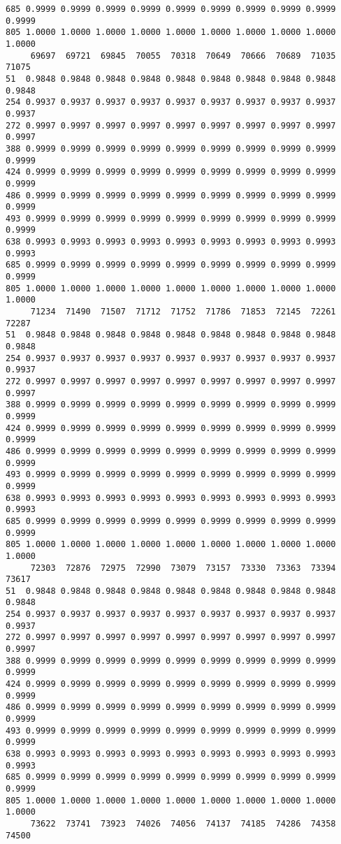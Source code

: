 \documentclass[
]{report}
\begin{document}
\begin{verbatim}
685 0.9999 0.9999 0.9999 0.9999 0.9999 0.9999 0.9999 0.9999 0.9999 0.9999
805 1.0000 1.0000 1.0000 1.0000 1.0000 1.0000 1.0000 1.0000 1.0000 1.0000
     69697  69721  69845  70055  70318  70649  70666  70689  71035  71075
51  0.9848 0.9848 0.9848 0.9848 0.9848 0.9848 0.9848 0.9848 0.9848 0.9848
254 0.9937 0.9937 0.9937 0.9937 0.9937 0.9937 0.9937 0.9937 0.9937 0.9937
272 0.9997 0.9997 0.9997 0.9997 0.9997 0.9997 0.9997 0.9997 0.9997 0.9997
388 0.9999 0.9999 0.9999 0.9999 0.9999 0.9999 0.9999 0.9999 0.9999 0.9999
424 0.9999 0.9999 0.9999 0.9999 0.9999 0.9999 0.9999 0.9999 0.9999 0.9999
486 0.9999 0.9999 0.9999 0.9999 0.9999 0.9999 0.9999 0.9999 0.9999 0.9999
493 0.9999 0.9999 0.9999 0.9999 0.9999 0.9999 0.9999 0.9999 0.9999 0.9999
638 0.9993 0.9993 0.9993 0.9993 0.9993 0.9993 0.9993 0.9993 0.9993 0.9993
685 0.9999 0.9999 0.9999 0.9999 0.9999 0.9999 0.9999 0.9999 0.9999 0.9999
805 1.0000 1.0000 1.0000 1.0000 1.0000 1.0000 1.0000 1.0000 1.0000 1.0000
     71234  71490  71507  71712  71752  71786  71853  72145  72261  72287
51  0.9848 0.9848 0.9848 0.9848 0.9848 0.9848 0.9848 0.9848 0.9848 0.9848
254 0.9937 0.9937 0.9937 0.9937 0.9937 0.9937 0.9937 0.9937 0.9937 0.9937
272 0.9997 0.9997 0.9997 0.9997 0.9997 0.9997 0.9997 0.9997 0.9997 0.9997
388 0.9999 0.9999 0.9999 0.9999 0.9999 0.9999 0.9999 0.9999 0.9999 0.9999
424 0.9999 0.9999 0.9999 0.9999 0.9999 0.9999 0.9999 0.9999 0.9999 0.9999
486 0.9999 0.9999 0.9999 0.9999 0.9999 0.9999 0.9999 0.9999 0.9999 0.9999
493 0.9999 0.9999 0.9999 0.9999 0.9999 0.9999 0.9999 0.9999 0.9999 0.9999
638 0.9993 0.9993 0.9993 0.9993 0.9993 0.9993 0.9993 0.9993 0.9993 0.9993
685 0.9999 0.9999 0.9999 0.9999 0.9999 0.9999 0.9999 0.9999 0.9999 0.9999
805 1.0000 1.0000 1.0000 1.0000 1.0000 1.0000 1.0000 1.0000 1.0000 1.0000
     72303  72876  72975  72990  73079  73157  73330  73363  73394  73617
51  0.9848 0.9848 0.9848 0.9848 0.9848 0.9848 0.9848 0.9848 0.9848 0.9848
254 0.9937 0.9937 0.9937 0.9937 0.9937 0.9937 0.9937 0.9937 0.9937 0.9937
272 0.9997 0.9997 0.9997 0.9997 0.9997 0.9997 0.9997 0.9997 0.9997 0.9997
388 0.9999 0.9999 0.9999 0.9999 0.9999 0.9999 0.9999 0.9999 0.9999 0.9999
424 0.9999 0.9999 0.9999 0.9999 0.9999 0.9999 0.9999 0.9999 0.9999 0.9999
486 0.9999 0.9999 0.9999 0.9999 0.9999 0.9999 0.9999 0.9999 0.9999 0.9999
493 0.9999 0.9999 0.9999 0.9999 0.9999 0.9999 0.9999 0.9999 0.9999 0.9999
638 0.9993 0.9993 0.9993 0.9993 0.9993 0.9993 0.9993 0.9993 0.9993 0.9993
685 0.9999 0.9999 0.9999 0.9999 0.9999 0.9999 0.9999 0.9999 0.9999 0.9999
805 1.0000 1.0000 1.0000 1.0000 1.0000 1.0000 1.0000 1.0000 1.0000 1.0000
     73622  73741  73923  74026  74056  74137  74185  74286  74358  74500

\end{verbatim}
\end{document}
